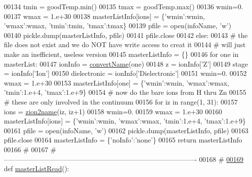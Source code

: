 \begin{DoxyCode}
{{00134             tmin = goodTemp.min()
00135             tmax = goodTemp.max()
00136             wmin=0.
00137             wmax = 1.e+30
00138             masterListInfo[ions] = \{\textcolor{stringliteral}{'wmin'}:wmin, \textcolor{stringliteral}{'wmax'}:wmax, \textcolor{stringliteral}{'tmin'}:tmin, \textcolor{stringliteral}{'tmax'}:tmax\}
00139         pfile = open(infoName, \textcolor{stringliteral}{'w'})
00140         pickle.dump(masterListInfo, pfile)
00141         pfile.close
00142     \textcolor{keywordflow}{else}:
00143         \textcolor{comment}{# the file does not exist and we do NOT have write access to creat it}
00144         \textcolor{comment}{# will just make an inefficient, useless version}
00145         masterListInfo = \{\}
00146         \textcolor{keywordflow}{for} one \textcolor{keywordflow}{in} masterList:
00147             ionInfo = \hyperlink{namespacepyneb_1_1utils_1_1__chianti__tools_a92cf299ad3407ee8923739e2761ab13f}{convertName}(one)
00148             z = ionInfo[\textcolor{stringliteral}{'Z'}]
00149             stage = ionInfo[\textcolor{stringliteral}{'Ion'}]
00150             dielectronic = ionInfo[\textcolor{stringliteral}{'Dielectronic'}]
00151             wmin=0.
00152             wmax = 1.e+30
00153             masterListInfo[one] = \{\textcolor{stringliteral}{'wmin'}:wmin, \textcolor{stringliteral}{'wmax'}:wmax, \textcolor{stringliteral}{'tmin'}:1.e+4, \textcolor{stringliteral}{'tmax'}:1.e+9\}
00154         \textcolor{comment}{#  now do the bare ions from H thru Zn}
00155         \textcolor{comment}{#  these are only involved in the continuum}
00156         \textcolor{keywordflow}{for} iz \textcolor{keywordflow}{in} range(1, 31):
00157             ions = \hyperlink{namespacepyneb_1_1utils_1_1__chianti__tools_a7d6debb5f68b52f64c311ca1fe99945c}{zion2name}(iz, iz+1)
00158             wmin=0.
00159             wmax = 1.e+30
00160             masterListInfo[ions] = \{\textcolor{stringliteral}{'wmin'}:wmin, \textcolor{stringliteral}{'wmax'}:wmax, \textcolor{stringliteral}{'tmin'}:1.e+4, \textcolor{stringliteral}{'tmax'}:1.e+9\}
00161         pfile = open(infoName, \textcolor{stringliteral}{'w'})
00162         pickle.dump(masterListInfo, pfile)
00163         pfile.close
00164         masterListInfo = \{\textcolor{stringliteral}{'noInfo'}:\textcolor{stringliteral}{'none'}\}
00165     \textcolor{keywordflow}{return} masterListInfo
00166     \textcolor{comment}{#}
00167     \textcolor{comment}{# -------------------------------------------------------------------------------------}
00168     \textcolor{comment}{#}
\hypertarget{__chianti__tools_8py_source_l00169}{}\hyperlink{namespacepyneb_1_1utils_1_1__chianti__tools_a1a4447320a9d614f994bc538890c32cd}{00169} \textcolor{keyword}{def }\hyperlink{namespacepyneb_1_1utils_1_1__chianti__tools_a1a4447320a9d614f994bc538890c32cd}{masterListRead}():
}}
\end{DoxyCode}
